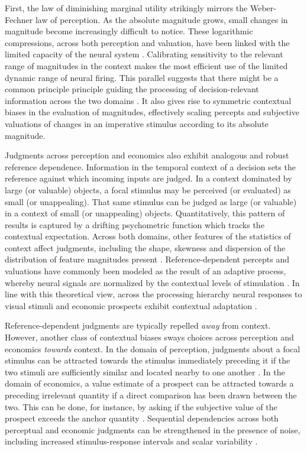 \documentclass[a4paper, nobind]{templates/ociamthesis}
\begin{document}
First, the law of diminishing marginal utility strikingly mirrors the Weber-Fechner law of perception. As the absolute magnitude grows, small changes in magnitude become increasingly difficult to notice. These logarithmic compressions, across both perception and valuation, have been linked with the limited capacity of the neural system \autocites[e.g.][]{wei2017,bhui2018}. Calibrating sensitivity to the relevant range of magnitudes in the context makes the most efficient use of the limited dynamic range of neural firing. This parallel suggests that there might be a common principle principle guiding the processing of decision-relevant information across the two domains \autocites{woodford2020}[although interestingly, Max Weber himself was skeptical of this idea,][]{weber1975}. It also gives rise to symmetric contextual biases in the evaluation of magnitudes, effectively scaling percepts and subjective valuations of changes in an imperative stimulus according to its absolute magnitude.

Judgments across perception and economics also exhibit analogous and robust reference dependence. Information in the temporal context of a decision sets the reference against which incoming inputs are judged. In a context dominated by large (or valuable) objects, a focal stimulus may be perceived (or evaluated) as small (or unappealing). That same stimulus can be judged as large (or valuable) in a context of small (or unappealing) objects. Quantitatively, this pattern of results is captured by a drifting psychometric function which tracks the contextual expectation. Across both domains, other features of the statistics of context affect judgments, including the shape, skewness and dispersion of the distribution of feature magnitudes present \autocite{parducci1965,rigoli2019}. Reference-dependent percepts and valuations have commonly been modeled as the result of an adaptive process, whereby neural signals are normalized by the contextual levels of stimulation \autocite{webster2015,rigoli2016}. In line with this theoretical view, across the processing hierarchy neural responses to visual stimuli and economic prospects exhibit contextual adaptation \autocites[e.g.][]{enroth-cugell1973,cox2014}.

Reference-dependent judgments are typically repelled \emph{away} from context. However, another class of contextual biases sways choices across perception and economics \emph{towards} context. In the domain of perception, judgments about a focal stimulus can be attracted towards the stimulus immediately preceding it if the two stimuli are sufficiently similar and located nearby to one another \autocite{liberman2014,st.john-saaltink2016,barbosa2020}. In the domain of economics, a value estimate of a prospect can be attracted towards a preceding irrelevant quantity if a direct comparison has been drawn between the two. This can be done, for instance, by asking if the subjective value of the prospect exceeds the anchor quantity \autocite{tversky1974}. Sequential dependencies across both perceptual and economic judgments can be strengthened in the presence of noise, including increased stimulus-response intervals and scalar variability \autocite{papadimitriou2016,lee2021}.
\end{document}
